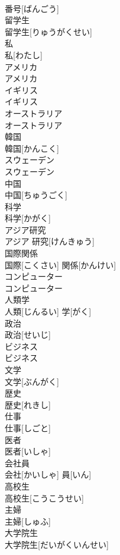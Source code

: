 \documentclass[8pt]{extreport}
\begin{document}
\begin{CJK}{UTF8}{min}
\\	番号[ばんごう]
\\	留学生	
\\	留学生[りゅうがくせい]
\\	私	
\\	私[わたし]
\\	アメリカ	
\\	アメリカ
\\	イギリス	
\\	イギリス
\\	オーストラリア	
\\	オーストラリア
\\	韓国	
\\	韓国[かんこく]
\\	スウェーデン	
\\	スウェーデン
\\	中国	
\\	中国[ちゅうごく]
\\	科学	
\\	科学[かがく]
\\	アジア研究	
\\	アジア 研究[けんきゅう]
\\	国際関係	
\\	国際[こくさい] 関係[かんけい]
\\	コンピューター	
\\	コンピューター
\\	人類学	
\\	人類[じんるい] 学[がく]
\\	政治	
\\	政治[せいじ]
\\	ビジネス	
\\	ビジネス
\\	文学	
\\	文学[ぶんがく]
\\	歴史	
\\	歴史[れきし]
\\	仕事	
\\	仕事[しごと]
\\	医者	
\\	医者[いしゃ]
\\	会社員	
\\	会社[かいしゃ] 員[いん]
\\	高校生	
\\	高校生[こうこうせい]
\\	主婦	
\\	主婦[しゅふ]
\\	大学院生	
\\	大学院生[だいがくいんせい]

\end{CJK}
\end{document}
